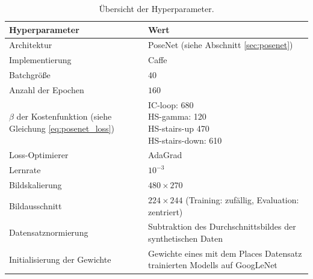 \cleardoublepage
\begin{table}[bp]
	\centering
	\caption{Übersicht der Hyperparameter.}
	\begin{tabularx}{1.0\textwidth}{X X}
		\textbf{Hyperparameter} & \textbf{Wert}\\
		\hline
		Architektur & PoseNet (siehe Abschnitt \ref{sec:posenet})\\
		\hline
		Implementierung & Caffe \cite{jiaCaffeConvolutionalArchitecture2014} \\
		\hline
		Batchgröße & $40$\\
		\hline
		Anzahl der Epochen & $160$\\
		\hline
		\makecell[tl]{
			$\beta$ der Kostenfunktion\\
			(siehe Gleichung \ref{eq:posenet_loss}) 
		} &
		\makecell[tl]{
			IC-loop: 680\\
			HS-gamma: 120\\
			HS-stairs-up 470\\
			HS-stairs-down: 610\\
		}\\
		\hline
		Loss-Optimierer & AdaGrad\\
		\hline
		Lernrate & $10^{-3}$\\
		\hline
		Bildskalierung & $480 \times 270$\\
		\hline
		Bildausschnitt& \makecell[tl]{
			$224 \times 244$\\
			(Training: zufällig, Evaluation: zentriert)\\
		}\\
		\hline
		Datensatznormierung & Subtraktion des Durchschnittsbildes der synthetischen Daten \\
		\hline
		Initialisierung der Gewichte & Gewichte eines mit dem Places Datensatz trainierten Modells auf GoogLeNet \\
	\end{tabularx}
	\label{tab:trainingparams}
\end{table}
\cleardoublepage